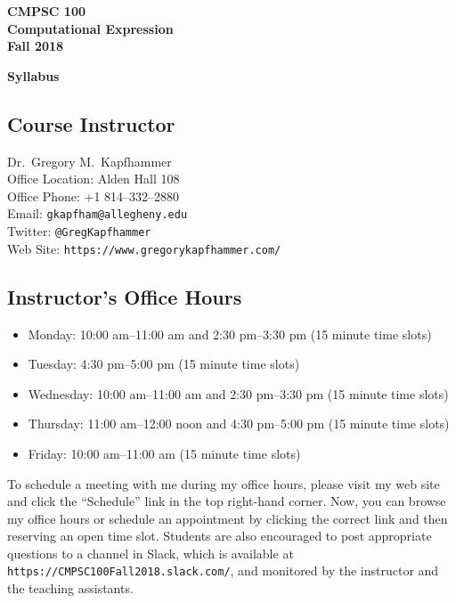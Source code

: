 \documentclass[11pt]{article}
\newcommand{\url}[1]{\lstinline{#1}}
\newcommand{\syllabustitle}[1]
{
  \begin{center}
    \begin{center}
      \bf
      CMPSC 100\\Computational Expression\\
      Fall 2018\\
      \medskip
    \end{center}
    \bf
    #1
  \end{center}
}
\begin{document}
\thispagestyle{empty}

\syllabustitle{Syllabus}

\vspace*{-.1in}
\subsection*{Course Instructor}
Dr.\ Gregory M.\ Kapfhammer\\
\noindent Office Location: Alden Hall 108 \\
\noindent Office Phone: +1 814--332--2880 \\
\noindent Email: \url{gkapfham@allegheny.edu} \\
\noindent Twitter: \url{@GregKapfhammer} \\
\noindent Web Site: \url{https://www.gregorykapfhammer.com/}

\subsection*{Instructor's Office Hours}

\vspace*{-.05in}

\begin{itemize}
  \itemsep0em

  \item Monday: 10:00 am--11:00 am and 2:30 pm--3:30 pm (15 minute time slots)

  \item Tuesday: 4:30 pm--5:00 pm (15 minute time slots)

  \item Wednesday: 10:00 am--11:00 am and 2:30 pm--3:30 pm (15 minute time slots)

  \item Thursday: 11:00 am--12:00 noon and 4:30 pm--5:00 pm (15 minute time slots)

  \item Friday: 10:00 am--11:00 am (15 minute time slots)

\end{itemize}

\noindent To schedule a meeting with me during my office hours, please visit my
web site and click the ``Schedule'' link in the top right-hand corner. Now, you
can browse my office hours or schedule an appointment by clicking the correct
link and then reserving an open time slot. Students are also encouraged to post
appropriate questions to a channel in Slack, which is available at
\url{https://CMPSC100Fall2018.slack.com/}, and monitored by the instructor and
the teaching assistants.
\end{document}
